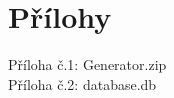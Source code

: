 \documentclass[
  digital,     %
  twoside,     %
  lof,         %
  lot,         %
]{fithesis4}
\begin{document}
\printbibliography[heading=bibintoc] %

  \makeatletter\thesis@blocks@clear\makeatother

\appendix %
\chapter{Přílohy}
Příloha č.1: Generator.zip\\Příloha č.2: database.db
\end{document}

